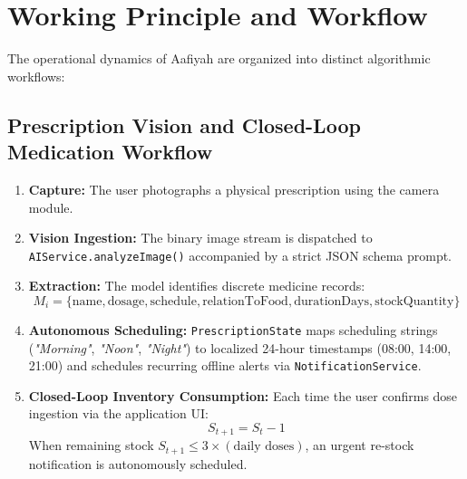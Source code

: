 \documentclass[12pt,a4paper,oneside]{report}
\begin{document}
\chapter{Working Principle and Workflow}

The operational dynamics of Aafiyah are organized into distinct algorithmic workflows:

\section{Prescription Vision and Closed-Loop Medication Workflow}
\begin{enumerate}
    \item \textbf{Capture:} The user photographs a physical prescription using the camera module.
    \item \textbf{Vision Ingestion:} The binary image stream is dispatched to \texttt{AIService.analyzeImage()} accompanied by a strict JSON schema prompt.
    \item \textbf{Extraction:} The model identifies discrete medicine records:
    \begin{equation}
        M_i = \{\text{name}, \text{dosage}, \text{schedule}, \text{relationToFood}, \text{durationDays}, \text{stockQuantity}\}
    \end{equation}
    \item \textbf{Autonomous Scheduling:} \texttt{PrescriptionState} maps scheduling strings (\textit{"Morning"}, \textit{"Noon"}, \textit{"Night"}) to localized 24-hour timestamps (08:00, 14:00, 21:00) and schedules recurring offline alerts via \texttt{NotificationService}.
    \item \textbf{Closed-Loop Inventory Consumption:} Each time the user confirms dose ingestion via the application UI:
    \begin{equation}
        S_{t+1} = S_t - 1
    \end{equation}
    When remaining stock $S_{t+1} \le 3 \times (\text{daily doses})$, an urgent re-stock notification is autonomously scheduled.
\end{enumerate}
\end{document}
